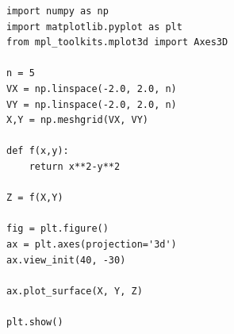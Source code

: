 \documentclass[11pt,class=report,crop=false]{standalone}
\begin{document}
\begin{minipage}{0.49\textwidth}
\begin{lstlisting}   
import numpy as np
import matplotlib.pyplot as plt
from mpl_toolkits.mplot3d import Axes3D

n = 5
VX = np.linspace(-2.0, 2.0, n)
VY = np.linspace(-2.0, 2.0, n)
X,Y = np.meshgrid(VX, VY)

def f(x,y):
	return x**2-y**2

Z = f(X,Y)

fig = plt.figure()
ax = plt.axes(projection='3d')
ax.view_init(40, -30)

ax.plot_surface(X, Y, Z)
 
plt.show()

\end{lstlisting}
\end{minipage}
\end{document}
